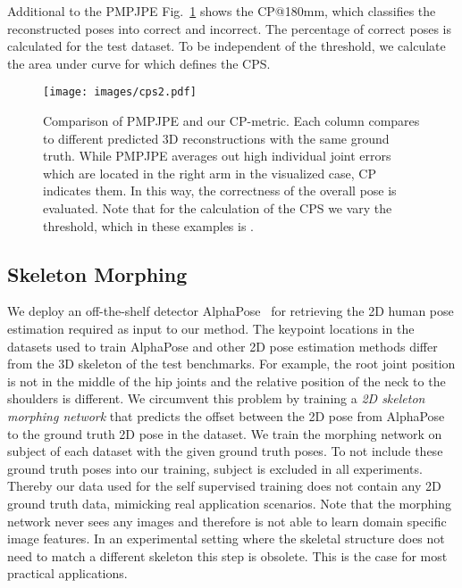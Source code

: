 \documentclass[final]{cvpr}
\begin{document}
Additional to the PMPJPE Fig.~\ref{fig:cps} shows the CP@180mm, which classifies the reconstructed poses into correct and incorrect.
The percentage of correct poses is calculated for the test dataset.
To be independent of the threshold, we calculate the area under curve for  which defines the CPS.

\begin{figure}
	\centering
	\texttt{[image: images/cps2.pdf]}
	\caption{Comparison of PMPJPE and our CP-metric. Each column compares to different predicted 3D reconstructions with the same ground truth. While PMPJPE averages out high individual joint errors which are located in the right arm in the visualized case, CP indicates them. In this way, the correctness of the overall pose is evaluated. Note that for the calculation of the CPS we vary the threshold, which in these examples is .}
	\label{fig:cps}
\end{figure}


\subsection{Skeleton Morphing}

We deploy an off-the-shelf detector AlphaPose~\cite{fang2017rmpe_alphapose} for retrieving the 2D human pose estimation required as input to our method.
The keypoint locations in the datasets used to train AlphaPose and other 2D pose estimation methods differ from the 3D skeleton of the test benchmarks.
For example, the root joint position is not in the middle of the hip joints and the relative position of the neck to the shoulders is different.
We circumvent this problem by training a \textit{2D skeleton morphing network}
that predicts the offset between the 2D pose from AlphaPose to the ground truth 2D pose in the dataset.
We train the morphing network on subject  of each dataset with the given ground truth poses.
To not include these ground truth poses into our training, subject  is excluded in all experiments. Thereby our data used for the self supervised training does not contain any 2D ground truth data, mimicking real application scenarios.
Note that the morphing network never sees any images and therefore is not able to learn domain specific image features.
In an experimental setting where the skeletal structure does not need to match a different skeleton this step is obsolete.
This is the case for most practical applications.
\end{document}
